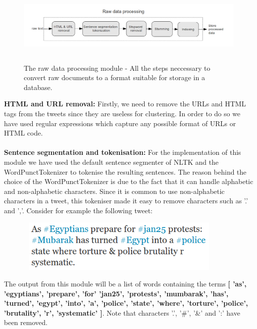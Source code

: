\begin{figure}[htbp]
  \begin{center}
    \includegraphics[height=1.5in, width=6in]{raw-data-processing}
    \caption{The raw data processing module - All the steps neccessary to convert raw documents to a format suitable for storage in a database.}
    \label{RawTextProcessingOverview}
  \end{center}
\end{figure} 
\noindent \textbf{HTML and URL removal:} Firstly, we need to remove the URLs and HTML tags from the tweets since they are useless for clustering. In order to do so we have used regular expressions which capture any possible format of URLs or HTML code.\\\\
\textbf{Sentence segmentation and tokenisation:} For the implementation of this module we have used the default sentence segmenter of NLTK and the WordPunctTokenizer to tokenise the resulting sentences. The reason behind the choice of the WordPunctTokenizer is due to the fact that it can handle alphabetic and non-alphabetic characters. Since it is common to use non-alphabetic characters in a tweet, this tokeniser made it easy to remove characters such as '.' and ','. Consider for example the following tweet:
 
\begin{figure}[htbp]
  \begin{center}
    \includegraphics[height=1in, width=4in]{tweet-text}
    \label{TweetText}
  \end{center}
\end{figure}

\noindent The output from this module will be a list of words containing the terms \textbf{[ 'as', 'egyptians', 'prepare', 'for' 'jan25', 'protests', 'mumbarak', 'has', 'turned', 'egypt', 'into', 'a', 'police', 'state', 'where', 'torture', 'police', 'brutality', 'r', 'systematic' ]}. Note that characters '.', '\#', '\&' and ':' have been removed. \\

